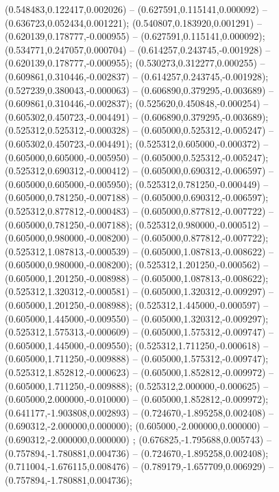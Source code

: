  (0.548483,0.122417,0.002026) -- (0.627591,0.115141,0.000092) -- (0.636723,0.052434,0.001221);
 (0.540807,0.183920,0.001291) -- (0.620139,0.178777,-0.000955) -- (0.627591,0.115141,0.000092);
 (0.534771,0.247057,0.000704) -- (0.614257,0.243745,-0.001928) -- (0.620139,0.178777,-0.000955);
 (0.530273,0.312277,0.000255) -- (0.609861,0.310446,-0.002837) -- (0.614257,0.243745,-0.001928);
 (0.527239,0.380043,-0.000063) -- (0.606890,0.379295,-0.003689) -- (0.609861,0.310446,-0.002837);
 (0.525620,0.450848,-0.000254) -- (0.605302,0.450723,-0.004491) -- (0.606890,0.379295,-0.003689);
 (0.525312,0.525312,-0.000328) -- (0.605000,0.525312,-0.005247) -- (0.605302,0.450723,-0.004491);
 (0.525312,0.605000,-0.000372) -- (0.605000,0.605000,-0.005950) -- (0.605000,0.525312,-0.005247);
 (0.525312,0.690312,-0.000412) -- (0.605000,0.690312,-0.006597) -- (0.605000,0.605000,-0.005950);
 (0.525312,0.781250,-0.000449) -- (0.605000,0.781250,-0.007188) -- (0.605000,0.690312,-0.006597);
 (0.525312,0.877812,-0.000483) -- (0.605000,0.877812,-0.007722) -- (0.605000,0.781250,-0.007188);
 (0.525312,0.980000,-0.000512) -- (0.605000,0.980000,-0.008200) -- (0.605000,0.877812,-0.007722);
 (0.525312,1.087813,-0.000539) -- (0.605000,1.087813,-0.008622) -- (0.605000,0.980000,-0.008200);
 (0.525312,1.201250,-0.000562) -- (0.605000,1.201250,-0.008988) -- (0.605000,1.087813,-0.008622);
 (0.525312,1.320312,-0.000581) -- (0.605000,1.320312,-0.009297) -- (0.605000,1.201250,-0.008988);
 (0.525312,1.445000,-0.000597) -- (0.605000,1.445000,-0.009550) -- (0.605000,1.320312,-0.009297);
 (0.525312,1.575313,-0.000609) -- (0.605000,1.575312,-0.009747) -- (0.605000,1.445000,-0.009550);
 (0.525312,1.711250,-0.000618) -- (0.605000,1.711250,-0.009888) -- (0.605000,1.575312,-0.009747);
 (0.525312,1.852812,-0.000623) -- (0.605000,1.852812,-0.009972) -- (0.605000,1.711250,-0.009888);
 (0.525312,2.000000,-0.000625) -- (0.605000,2.000000,-0.010000) -- (0.605000,1.852812,-0.009972);
 (0.641177,-1.903808,0.002893) -- (0.724670,-1.895258,0.002408) -- (0.690312,-2.000000,0.000000);
 (0.605000,-2.000000,0.000000) -- (0.690312,-2.000000,0.000000) ;
 (0.676825,-1.795688,0.005743) -- (0.757894,-1.780881,0.004736) -- (0.724670,-1.895258,0.002408);
 (0.711004,-1.676115,0.008476) -- (0.789179,-1.657709,0.006929) -- (0.757894,-1.780881,0.004736);
